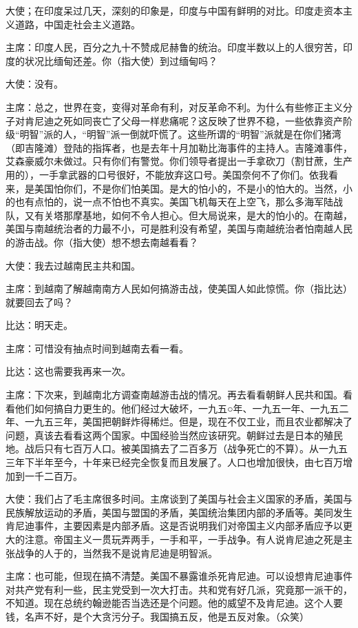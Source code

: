 大使；在印度呆过几天，深刻的印象是，印度与中国有鲜明的对比。印度走资本主义道路，中国走社会主义道路。

主席：印度人民，百分之九十不赞成尼赫鲁的统治。印度半数以上的人很穷苦，印度的状况比缅甸还差。你（指大使）到过缅甸吗？

大使：没有。

主席：总之，世界在变，变得对革命有利，对反革命不利。为什么有些修正主义分子对肯尼迪之死如同丧亡了父母一样悲痛呢？这反映了世界不稳，一些依靠资产阶级“明智”派的人，“明智”派一倒就吓慌了。这些所谓的“明智”派就是在你们猪湾（即吉隆滩）登陆的指挥者，也是去年十月加勒比海事件的主持人。吉隆滩事件，艾森豪威尔未做过。只有你们有警觉。你们领导者提出一手拿砍刀（割甘蔗，生产用的），一手拿武器的口号很好，不能放弃这口号。美国奈何不了你们。依我看来，是美国怕你们，不是你们怕美国。是大的怕小的，不是小的怕大的。当然，小的也有点怕的，说一点不怕也不真实。美国飞机每天在上空飞，那么多海军陆战队，又有关塔那摩基地，如何不令人担心。但大局说来，是大的怕小的。在南越，美国与南越统治者的力最不小，可是胜利没有希望，美国与南越统治者怕南越人民的游击战。你（指大使）想不想去南越看看？

大使：我去过越南民主共和国。

主席：到越南了解越南南方人民如何搞游击战，使美国人如此惊慌。你（指比达）就要回去了吗？

比达：明天走。

主席：可惜没有抽点时间到越南去看一看。

比达：这也需要我再来一次。

主席：下次来，到越南北方调查南越游击战的情况。再去看看朝鲜人民共和国。看看他们如何搞自力更生的。他们经过大破坏，一九五○年、一九五一年、一九五二年、一九五三年，美国把朝鲜炸得稀烂。但是，现在不仅工业，而且农业都解决了问题，真该去看看这两个国家。中国经验当然应该研究。朝鲜过去是日本的殖民地。战后只有七百万人口。被美国搞去了二百多万（战争死亡的不算）。从一九五三年下半年至今，十年来已经完全恢复而且发展了。人口也增加很快，由七百万增加到一千二百万。

大使：我们占了毛主席很多时间。主席谈到了美国与社会主义国家的矛盾，美国与民族解放运动的矛盾，美国与盟国的矛盾，美国统治集团内部的矛盾等。美同发生肯尼迪事件，主要因素是内部矛盾。这是否说明我们对帝国主义内部矛盾应予以更大的注意。帝国主义一贯玩弄两手，一手和平，一手战争。有人说肯尼迪之死是主张战争的人于的，当然我不是说肯尼迪是明智派。

主席：也可能，但现在搞不清楚。美国不暴露谁杀死肯尼迪。可以设想肯尼迪事件对共产党有利一些，民主党受到一次大打击。共和党有好几派，究竟那一派干的，不知道。现在总统约翰逊能否当选还是个问题。他的威望不及肯尼迪。这个人要钱，名声不好，是个大贪污分子。我国搞五反，他是五反对象。（众笑）

